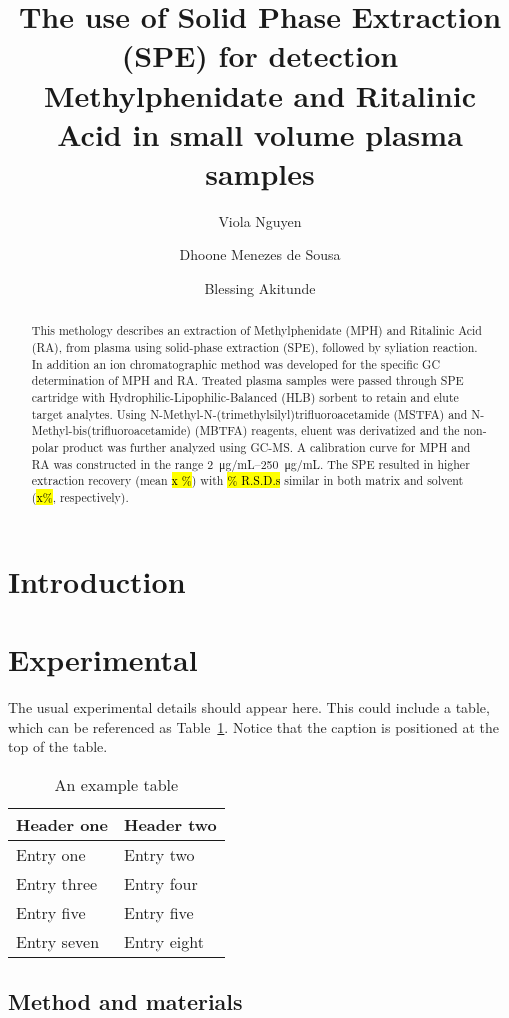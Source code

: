 \documentclass[journal=jacsat,manuscript=article]{achemso}
\author{Viola Nguyen}
\author{Dhoone Menezes de Sousa}
\author{Blessing Akitunde}
\affiliation{Icahn School of Medicine}
\title{The use of Solid Phase Extraction (SPE) for detection Methylphenidate and Ritalinic Acid in small volume plasma samples }
\begin{document}
\begin{abstract}
This methology describes an extraction of Methylphenidate (MPH) and Ritalinic Acid (RA), from plasma using solid-phase extraction (SPE), followed by syliation reaction. In addition an ion chromatographic method was developed for the specific GC determination of MPH and RA.  Treated plasma samples were passed through SPE cartridge with Hydrophilic-Lipophilic-Balanced (HLB) sorbent to retain and elute target analytes. Using N-Methyl-N-(trimethylsilyl)trifluoroacetamide (MSTFA) and N-Methyl-bis(trifluoroacetamide) (MBTFA) reagents, eluent was derivatized and the non-polar product was further analyzed using GC-MS. A calibration curve for MPH and RA was constructed in the range  \SIrange[range-units = brackets]{2}{250}{\micro \gram/mL}. The SPE resulted in higher extraction recovery (mean \hl  {x \%}) with \hl {\% R.S.D.s} similar in both matrix and solvent (\hl {x\%}, respectively).

\end{abstract}

\section{Introduction}

\section{Experimental}
The usual experimental details should appear here.  This could
include a table, which can be referenced as Table~\ref{tbl:example}.
Notice that the caption is positioned at the top of the table.
\begin{table}
  \caption{An example table}
  \label{tbl:example}
  \begin{tabular}{ll}
    \hline
    Header one  & Header two  \\
    \hline
    Entry one   & Entry two   \\
    Entry three & Entry four  \\
    Entry five  & Entry five  \\
    Entry seven & Entry eight \\
    \hline
  \end{tabular}
\end{table}

\subsection{Method and materials}
\end{document}
